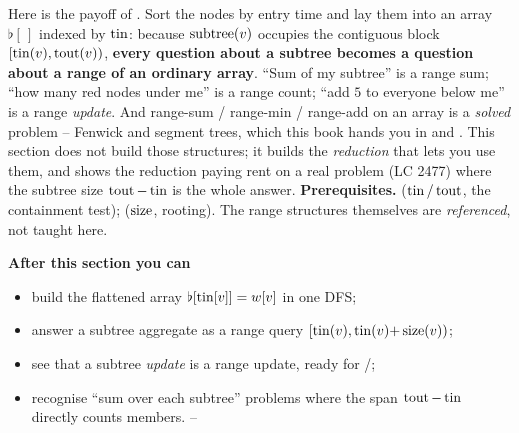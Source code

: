\begin{topicintro}
Here is the payoff of . Sort the nodes by entry time and lay them into an
array $\flat[\,]$ indexed by $\operatorname{tin}$: because $\operatorname{subtree}(v)$ occupies the contiguous block
$[\operatorname{tin}(v), \operatorname{tout}(v))$, \textbf{every question about a subtree becomes a question about a
range of an ordinary array}. ``Sum of my subtree'' is a range sum; ``how many red nodes under
me'' is a range count; ``add $5$ to everyone below me'' is a range \emph{update}. And
range-sum / range-min / range-add on an array is a \emph{solved} problem -- Fenwick and
segment trees, which this book hands you in  and . This section does
not build those structures; it builds the \emph{reduction} that lets you use them, and
shows the reduction paying rent on a real problem (LC 2477) where the subtree size
$\operatorname{tout}-\operatorname{tin}$ is the whole answer.
\textbf{Prerequisites.}  ($\operatorname{tin}/\operatorname{tout}$, the containment test);
 ($\operatorname{size}$, rooting). The range structures themselves are
\emph{referenced}, not taught here.

\textbf{After this section you can}
\begin{itemize}[nosep]
  \item build the flattened array $\flat[\operatorname{tin}[v]] = w[v]$ in one DFS;        \hfill{}
  \item answer a subtree aggregate as a range query $[\operatorname{tin}(v), \operatorname{tin}(v){+}\operatorname{size}(v))$; \hfill{}
  \item see that a subtree \emph{update} is a range update, ready for /; \hfill{}
  \item recognise ``sum over each subtree'' problems where the span $\operatorname{tout}-\operatorname{tin}$ directly
        counts members.                                                       \hfill{}--
\end{itemize}
\end{topicintro}

